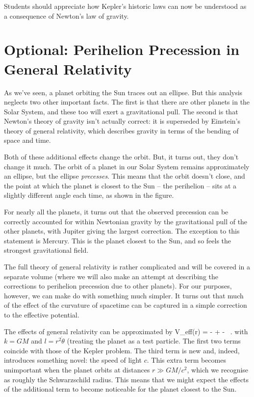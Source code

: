 Students should appreciate how Kepler's historic laws can now be understood as a consequence of Newton's law of gravity. 

\newpage
\section{Optional: Perihelion Precession in General Relativity}

As we've seen,  a planet orbiting the Sun traces out an ellipse. But this analysis neglects two other important facts. The first is that there are other planets in the Solar System, and these too will exert a gravitational pull. The second is that Newton's theory of gravity isn't actually correct: it is superseded by Einstein's theory of general relativity, which describes gravity in terms of the bending of space and time.



\para
Both of these additional effects change the orbit. But, it turns out, they don't change it much. The orbit of a planet  in our Solar System remains approximately an ellipse, but the ellipse {\it precesses}. This means that the orbit doesn't close, and the point at which the planet is closest to the Sun -- the perihelion -- sits at a slightly different angle each time, as shown in the figure. 

\para
For nearly all the planets, it turns out that the observed precession can be correctly accounted for within Newtonian gravity by the gravitational pull of the other planets, with Jupiter giving the largest correction. The exception to this statement is Mercury. This is the planet closest to the Sun, and so feels the strongest gravitational field. 

\para
The full theory of general relativity is rather complicated and will be covered in a separate volume (where we will also make an attempt at describing the corrections to perihelion precession due to other planets). For our purposes, however, we can make do with something much simpler. It turns out that much of  the  effect of the curvature of spacetime can be captured in a simple correction to the effective potential.

\para
{\co The effects of general relativity can be approximated by
%
\be V_{\rm eff}(r) = - +  - \ .\ee
%
with  $k=GM$ and $l=r^2\dot{\theta}$ (treating the planet as a test particle.} The first two terms coincide with those of the Kepler problem. The third term is new and, indeed, introduces something novel: the speed of light $c$. This extra term becomes unimportant  when the planet orbits at distances $r\gg GM/c^2$, which we recognise as roughly the Schwarzschild radius. This means that we might expect the effects of the additional term to become noticeable for the planet closest to the Sun. 



